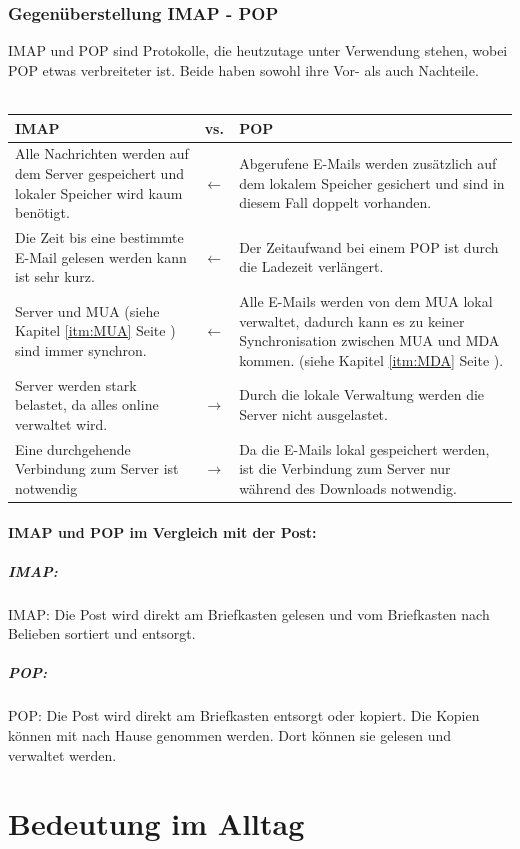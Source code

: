 \documentclass[12pt,a4paper]{report}
\begin{document}
\begin{onehalfspace}
\subsubsection{Gegenüberstellung IMAP - POP} \label{sssec:IMAPvsPOP}
IMAP und POP sind Protokolle, die heutzutage unter Verwendung stehen, wobei POP etwas verbreiteter ist. Beide haben sowohl ihre Vor- als auch Nachteile. \\\\
\begin{center}
\begin{tabular}{p{6cm}|c|p{6cm}}
\textbf{IMAP} & vs. &\textbf{POP}\\
\hline
Alle Nachrichten werden auf dem Server gespeichert und lokaler Speicher wird kaum benötigt. & $\leftarrow$ & Abgerufene E-Mails werden zusätzlich auf dem lokalem Speicher gesichert und sind in diesem Fall doppelt vorhanden. \\
\hline
Die Zeit bis eine bestimmte E-Mail gelesen werden kann ist sehr kurz. & $\leftarrow$ & Der Zeitaufwand bei einem POP ist durch die Ladezeit verlängert. \\
\hline
Server und MUA (siehe Kapitel \ref{itm:MUA} Seite \pageref{itm:MUA}) sind immer synchron. & $\leftarrow$ & Alle E-Mails werden von dem MUA lokal verwaltet, dadurch kann es zu keiner Synchronisation zwischen MUA und MDA kommen.  (siehe Kapitel \ref{itm:MDA} Seite \pageref{itm:MDA}).\\
\hline
Server werden stark belastet, da alles online verwaltet wird. & $\rightarrow$ & Durch die lokale Verwaltung werden die Server nicht ausgelastet.\\
\hline
Eine durchgehende Verbindung zum Server ist notwendig & $\rightarrow$ & Da die E-Mails lokal gespeichert werden, ist die Verbindung zum Server nur während des Downloads notwendig.
\end{tabular}
\end{center}
\paragraph{IMAP und POP im Vergleich mit der Post:}
\subparagraph{IMAP:} IMAP: Die Post wird direkt am Briefkasten gelesen und vom Briefkasten nach Belieben sortiert und entsorgt.
\subparagraph{POP:} POP: Die Post wird direkt am Briefkasten entsorgt oder kopiert. Die Kopien können mit nach Hause genommen werden. Dort können sie gelesen und verwaltet werden. 
\section{Bedeutung im Alltag}

\end{onehalfspace}
\end{document}
